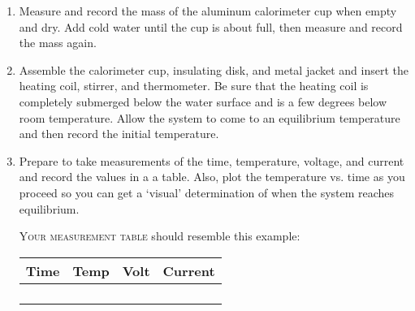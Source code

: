 \begin{enumerate}
\item
Measure and record the mass of the aluminum calorimeter cup when empty and dry.
Add cold water until the cup is about  full, then measure and record the mass again.

\item
Assemble the calorimeter cup, insulating disk, and metal jacket and insert the heating coil, stirrer, and thermometer.  Be sure that the heating coil is completely submerged below the water surface and is a few degrees below room temperature. Allow the system to come to an equilibrium temperature and then record the initial temperature.

\item
Prepare to take measurements of the time, temperature, voltage, and current and record the values in a a table. Also, plot the temperature vs. time as you proceed so you can get a `visual' determination of when the system reaches equilibrium.
\begin{marginfigure}[-36pt]
	\textsc{Your measurement table} should resemble this example:
	
%
	\begin{tabular}{p{.7cm}|p{.7cm}|p{.7cm}|p{.9cm}}
		Time			&Temp			 &Volt			&Current\\[0.4ex]	
		\hline
		 & & 	& \\
		\hline
		& & 	&\\
		\hline 
		& & 	&\\
		\hline 
		& & 	&\\
		\hline
	\end{tabular}
%	
\end{marginfigure}


\end{enumerate}
